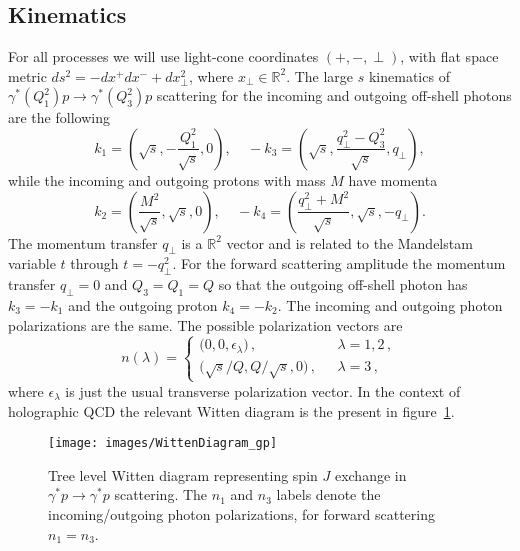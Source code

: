 \documentclass[a4paper,12pt]{article}
\begin{document}
\subsection{Kinematics}
For all processes we will use light-cone coordinates $\left(+,-,\perp \right)$, with flat space metric $ds^2 = - dx^+ dx^- + d x^2_\perp$, where $x_\perp \in \mathbb{R}^2$.
The large $s$ kinematics of  $\gamma^{*} \left(Q_1^2\right) p \rightarrow \gamma^{*} \left(Q_3^2\right) p $ scattering for the incoming and outgoing off-shell photons are the following
\begin{equation}
k_1=\left(\!\sqrt{s},-\frac{Q_1^2}{\sqrt{s}} ,0\right),
\ \ \ \ \ 
-k_3=\left(\sqrt{s} , \frac{q_\perp^2 - Q_3^2}{\sqrt{s}}, q_\perp \right),
\label{eq:gp_off_shell_photons_kinematics}
\end{equation}
while the incoming and outgoing protons with mass $M$ have momenta
\begin{equation}
k_2=\left(\frac{M^2}{\sqrt{s}} , \sqrt{s}, 0\right),
\ \ \ \ \ 
-k_4=\left(\frac{q_\perp^2 + M^2}{\sqrt{s}}, \sqrt{s},  -q_\perp \right).
\label{eq:gp_off_shell_protons_kinematics}
\end{equation}
The momentum transfer $q_\perp$ is a $\mathbb{R}^2$ vector and is related to the Mandelstam variable $t$ through $t = - q_\perp^2$.
For the forward scattering amplitude the 
momentum transfer $q_\perp = 0$ and $Q_3 = Q_1 = Q$ so that the outgoing off-shell photon has $k_3=-k_1$ and the outgoing
proton $k_4=-k_2$. The  incoming and outgoing photon polarizations are the same.
The possible polarization vectors are
\begin{equation}
  \label{eq:polarization vectors} 
n(\lambda) = \begin{cases}
    \big(0,0,\epsilon_\lambda\big) \,, & \ \ \ \lambda=1,2 \,,\\
   \big( \sqrt{s}/Q, Q/\sqrt{s},0  \big)\, , & \ \ \ \lambda=3\,,
    \end{cases}
\end{equation}
where $\epsilon_\lambda$ is just the usual transverse polarization vector.
In the context of holographic QCD the relevant Witten diagram is the present in figure~\ref{fig:Witten_diagram_gp}.
\begin{figure}[!t]
  \center
  \texttt{[image: images/WittenDiagram\_gp]} 
  \caption{Tree level Witten diagram representing spin $J$    exchange in  $\gamma^* p\to\gamma^* p$ scattering. 
The $n_1$ and $n_3$ labels denote the incoming/outgoing photon polarizations, for forward scattering $n_1=n_3$.
}
  \label{fig:Witten_diagram_gp}
\end{figure}
\end{document}
